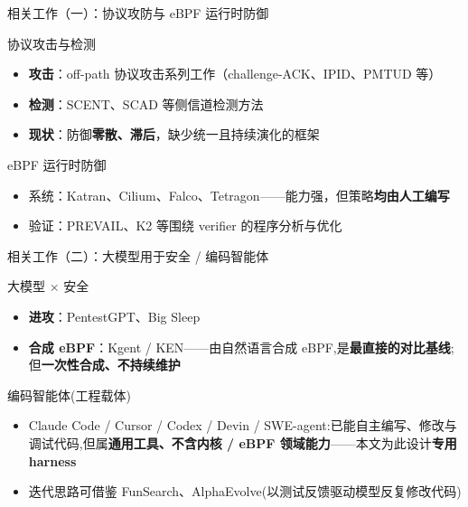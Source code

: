 \documentclass[aspectratio=169,10pt]{beamer}
\begin{document}
\begin{frame}{相关工作（一）：协议攻防与 eBPF 运行时防御}
    \begin{block}{协议攻击与检测}
        \begin{itemize}
            \item \textbf{攻击}：off-path 协议攻击系列工作（challenge-ACK、IPID、PMTUD 等）\supercite{feng2025cacm,feng2025pmtudisolation}
            \item \textbf{检测}：SCENT\supercite{cao2019scent}、SCAD\supercite{man2024scad} 等侧信道检测方法
            \item \textbf{现状}：防御\textbf{零散、滞后}，缺少统一且持续演化的框架
        \end{itemize}
    \end{block}
    \begin{block}{eBPF 运行时防御}
        \begin{itemize}
            \item 系统：Katran\supercite{shirokov2018katran}、Cilium\supercite{graf2020cilium}、Falco\supercite{falco2018}、Tetragon\supercite{tetragon2022}——能力强，但策略\textbf{均由人工编写}
            \item 验证：PREVAIL\supercite{gershuni2019prevail}、K2\supercite{xu2021k2} 等围绕 verifier 的程序分析与优化
        \end{itemize}
    \end{block}
\end{frame}

\begin{frame}{相关工作（二）：大模型用于安全 / 编码智能体}
    \begin{block}{大模型 $\times$ 安全}
        \begin{itemize}
            \item \textbf{进攻}：PentestGPT\supercite{deng2024pentestgpt}、Big Sleep\supercite{glazunov2024naptime}
            \item \textbf{合成 eBPF}：\alert{Kgent / KEN}\supercite{yang2024kgent}——由自然语言合成 eBPF,是\textbf{最直接的对比基线};但\textbf{一次性合成、不持续维护}
        \end{itemize}
    \end{block}
    \begin{block}{编码智能体(工程载体)}
        \begin{itemize}
            \item Claude Code / Cursor / Codex / Devin / SWE-agent\supercite{anthropic2025claudecode,cursor2024,yang2024sweagent}:已能自主编写、修改与调试代码,但属\textbf{通用工具、不含内核 / eBPF 领域能力}——本文为此设计\textbf{专用 harness}
            \item 迭代思路可借鉴 FunSearch、AlphaEvolve\supercite{romeraparedes2024funsearch,novikov2025alphaevolve}(以测试反馈驱动模型反复修改代码)
        \end{itemize}
    \end{block}
\end{frame}
\end{document}
